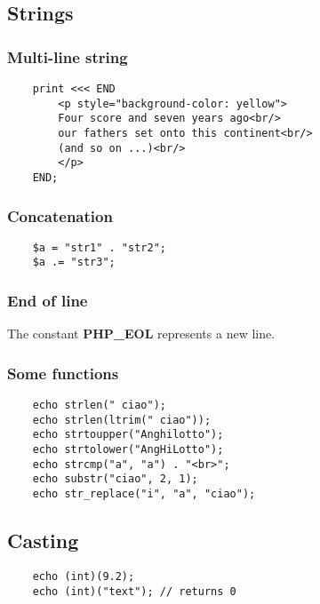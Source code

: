 \documentclass[a4paper]{article}
\begin{document}
\subsection{Strings}

\subsubsection{Multi-line string}

\begin{lstlisting}
    print <<< END
        <p style="background-color: yellow">
        Four score and seven years ago<br/>
        our fathers set onto this continent<br/>
        (and so on ...)<br/>
        </p>
    END;
\end{lstlisting}

\subsubsection{Concatenation}

\begin{lstlisting}
    $a = "str1" . "str2";
    $a .= "str3";
\end{lstlisting}

\subsubsection{End of line}

The constant \textbf{PHP\_EOL} represents a new line.

\subsubsection{Some functions}

\begin{lstlisting}
    echo strlen(" ciao");
    echo strlen(ltrim(" ciao"));
    echo strtoupper("Anghilotto");
    echo strtolower("AngHiLotto");
    echo strcmp("a", "a") . "<br>";
    echo substr("ciao", 2, 1);
    echo str_replace("i", "a", "ciao");
\end{lstlisting}

\subsection{Casting}

\begin{lstlisting}
    echo (int)(9.2);
    echo (int)("text"); // returns 0
\end{lstlisting}
\end{document}
